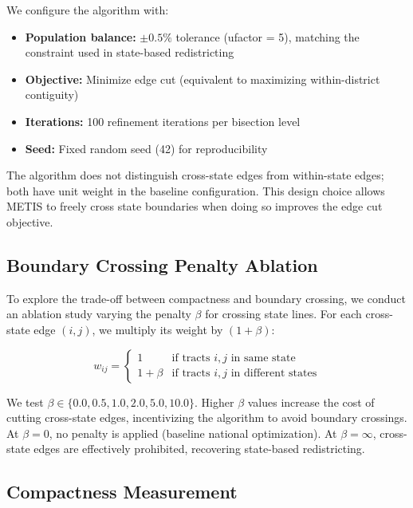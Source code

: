 We configure the algorithm with:
\begin{itemize}
    \item \textbf{Population balance:} $ \pm 0.5\% $ tolerance (ufactor = 5), matching the constraint used in state-based redistricting
    \item \textbf{Objective:} Minimize edge cut (equivalent to maximizing within-district contiguity)
    \item \textbf{Iterations:} 100 refinement iterations per bisection level
    \item \textbf{Seed:} Fixed random seed (42) for reproducibility
\end{itemize}

The algorithm does not distinguish cross-state edges from within-state edges; both have unit weight in the baseline configuration. This design choice allows METIS to freely cross state boundaries when doing so improves the edge cut objective.

\subsection{Boundary Crossing Penalty Ablation}

To explore the trade-off between compactness and boundary crossing, we conduct an ablation study varying the penalty $ \beta $ for crossing state lines. For each cross-state edge $ (i,j) $, we multiply its weight by $ (1 + \beta) $:

\begin{equation}
w_{ij} = \begin{cases}
1 & \text{if tracts } i, j \text{ in same state} \\
1 + \beta & \text{if tracts } i, j \text{ in different states}
\end{cases}
\end{equation}

We test $ \beta \in \{0.0, 0.5, 1.0, 2.0, 5.0, 10.0\} $. Higher $ \beta $ values increase the cost of cutting cross-state edges, incentivizing the algorithm to avoid boundary crossings. At $ \beta = 0 $, no penalty is applied (baseline national optimization). At $ \beta = \infty $, cross-state edges are effectively prohibited, recovering state-based redistricting.

\subsection{Compactness Measurement}

